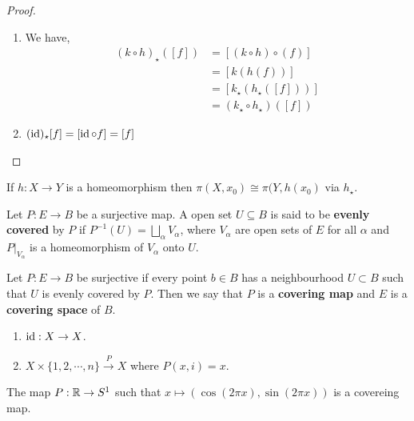 \documentclass[12pt]{amsart}
\begin{document}
\begin{proof}
    \bbni

    \begin{enumerate}
        \item [(a)] We have, 
        \begin{align*}
            (k \circ h)_\star ([f]) &= \left[(k \circ h) \circ (f)\right] \\
            &= [k(h(f))] \\ 
            &= [k_\star(h_\star([f]))]\\
            &= (k_\star \circ h_\star) ([f])
        \end{align*}
        \item [(b)] $(\operatorname{id})_\star [f] = [\operatorname{id} \circ f] = [f]$
    \end{enumerate}
\end{proof}

\begin{corollary}
    If $h: X\to Y$ is a homeomorphism then $\pi(X, x_0) \cong \pi(Y, h(x_0)$ via $h_\star$. 
\end{corollary}

\begin{definition}
    Let $P: E\to B$ be a surjective map. A open set $U \subseteq B$ is said to be \textbf{evenly covered} by $P$ if $P^{-1} (U) = \underset \alpha \bigsqcup V_\alpha$, where $V_\alpha$ are open sets of $E$ for all $\alpha$ and $P|_{V_\alpha}$ is a homeomorphism of $V_\alpha$ onto $U$. 
\end{definition}

\begin{definition}
    Let $P: E \to B$ be surjective if every point $b \in B$ has a neighbourhood $U \subset B$ such that $U$ is evenly covered by $P$. Then we say that $P$ is a \textbf{covering map} and $E$ is a \textbf{covering space }of $B$.

    \begin{example}
        \bbni

        \begin{enumerate}
        \item $\operatorname{id}: X \to X$. 
        \item $X \times \{1, 2, \cdots, n\} \overset P \to X$ where $P(x, i)  = x$.
        \end{enumerate} 
    \end{example}
\end{definition}

\begin{theorem}
    The map $P: \mathbb R \to S^1$ such that $x \mapsto (\cos(2\pi x), \sin(2 \pi x))$ is a covereing map. 
\end{theorem}
\end{document}
